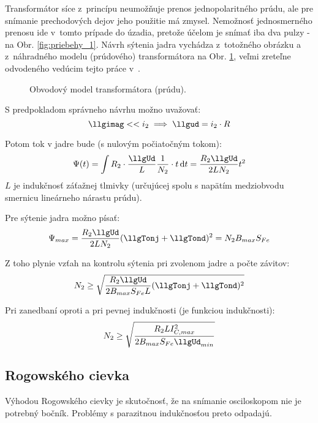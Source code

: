 Transformátor síce z~princípu neumožňuje prenos jednopolaritného prúdu, ale pre snímanie prechodových dejov jeho použitie má zmysel. Nemožnosť jednosmerného prenosu ide v~tomto prípade do úzadia, pretože účelom je snímať iba dva pulzy - \llgic na Obr. \ref{fig:priebehy_1}. Návrh sýtenia jadra vychádza z~totožného obrázku a z~náhradného modelu (prúdového) transformátora na Obr. \ref{fig:prudove_trafo_model}, veľmi zreteľne odvodeného vedúcim tejto práce v~\cite{patocka:kniha}.
\begin{figure}[!ht]
	\centering
	
	\caption{Obvodový model transformátora (prúdu).}
	\label{fig:prudove_trafo_model}
\end{figure}
S predpokladom správneho návrhu možno uvažovať:
\begin{equation}
	\llgimag << i_2 \implies \llgud = i_2 \cdot R
	\label{u2=i2*R}
\end{equation}

Potom tok v jadre bude (s nulovým počiatočným tokom):
\begin{equation}
    \Psi(t) = \int R_2 \cdot \frac{\llgUd}{L} \frac{1}{N_2} \cdot t \dif t = \frac{R_2 \llgUd}{2 L N_2} t^2
	\label{eq:Psi_t}
\end{equation}
$L$ je indukčnosť záťažnej tlmivky (určujúcej spolu s napätím medziobvodu smernicu lineárneho nárastu prúdu).

Pre sýtenie jadra možno písať:
\begin{equation}
	\Psi_{max} = \frac{R_2 \llgUd}{2 L N_2} (\llgTonj + \llgTond)^2 = N_2 B_{max} S_{Fe}
	\label{Psi_max}
\end{equation}

Z toho plynie vzťah na kontrolu sýtenia pri zvolenom jadre a počte závitov:
\begin{equation}
    N_2 \geq \sqrt{\frac{R_2 \llgUd}{2 B_{max} S_{Fe} L} (\llgTonj+\llgTond)^2}
	\label{eq_N2_fTon1Ton2}
\end{equation}

Pri zanedbaní \llgTond oproti \llgTonj a pri pevnej indukčnosti (\llgTonj je funkciou indukčnosti):
\begin{equation}
    N_2 \geq \sqrt{\frac{R_2 L I_{C,max}^2}{2 B_{max}S_{Fe}\llgUd_{min}}}
	\label{eq:N2_fIcUd}
\end{equation}






\subsection{Rogowského cievka}
Výhodou Rogowského cievky je skutočnosť, že na snímanie osciloskopom nie je potrebný bočník. Problémy s parazitnou indukčnosťou preto odpadajú.

